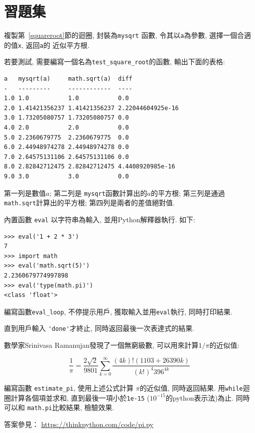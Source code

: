 \documentclass[10pt]{book}
\begin{document}
\section{習題集}

\begin{exercise}

複製第~\ref{squareroot}節的迴圈, 封裝為\verb"mysqrt" 函數, 
令其以{\tt a}為參數, 選擇一個合適的值{\tt x}, 返回{\tt a}的
近似平方根.  

若要測試, 需要編寫一個名為\verb"test_square_root"的函數, 
輸出下面的表格:

\begin{verbatim}
a   mysqrt(a)     math.sqrt(a)  diff
-   ---------     ------------  ----
1.0 1.0           1.0           0.0
2.0 1.41421356237 1.41421356237 2.22044604925e-16
3.0 1.73205080757 1.73205080757 0.0
4.0 2.0           2.0           0.0
5.0 2.2360679775  2.2360679775  0.0
6.0 2.44948974278 2.44948974278 0.0
7.0 2.64575131106 2.64575131106 0.0
8.0 2.82842712475 2.82842712475 4.4408920985e-16
9.0 3.0           3.0           0.0
\end{verbatim}
%
第一列是數值$a$; 第二列是 \verb"mysqrt"函數計算出的$a$的平方根;
第三列是通過{\tt math.sqrt}計算出的平方根;
第四列是兩者的差值絕對值. 
\end{exercise}


\begin{exercise}
內置函數 {\tt eval} 以字符串為輸入, 並用Python解釋器執行. 
如下:

\begin{verbatim}
>>> eval('1 + 2 * 3')
7
>>> import math
>>> eval('math.sqrt(5)')
2.2360679774997898
>>> eval('type(math.pi)')
<class 'float'>
\end{verbatim}
%
編寫函數\verb"eval_loop", 不停提示用戶, 獲取輸入並用{\tt eval}執行, 
同時打印結果. 

直到用戶輸入 \verb"'done'"才終止, 
同時返回最後一次表達式的結果. 

\end{exercise}


\begin{exercise}
數學家Srinivasa Ramanujan發現了一個無窮級數, 
可以用來計算$1 / \pi$的近似值:

\[ \frac{1}{\pi} = \frac{2\sqrt{2}}{9801} 
\sum^\infty_{k=0} \frac{(4k)!(1103+26390k)}{(k!)^4 396^{4k}} \]

編寫函數 \verb"estimate_pi", 使用上述公式計算 $\pi$的近似值, 
同時返回結果. 用{\tt while}迴圈計算各個項並求和, 直到最後一項小於{\tt 1e-15}
($10^{-15}$的python表示法)為止. 
同時可以和 {\tt math.pi}比較結果, 檢驗效果. 

答案參見： \url{https://thinkpython.com/code/pi.py}

\end{exercise}
\end{document}
